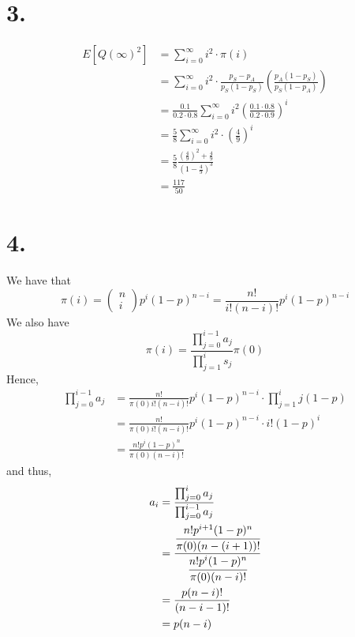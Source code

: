 \documentclass[11pt]{article}
\begin{document}
\section*{3.}
\begin{equation*}
    \begin{aligned}
        E[Q(\infty)^2] &= \sum_{i=0}^\infty i^2 \cdot \pi(i) \\
        &= \sum_{i=0}^\infty i^2 \cdot \frac{p_S - p_A}{p_S(1-p_S)} \left(\frac{p_A(1-p_S)}{p_S(1-p_A)}\right) \\
        &= \frac{0.1}{0.2 \cdot 0.8} \sum_{i=0}^\infty i^2 \left(\frac{0.1 \cdot 0.8}{0.2 \cdot 0.9} \right)^i \\
        &= \frac{5}{8} \sum_{i=0}^\infty i^2 \cdot \left(\frac{4}{9}\right)^i \\
        &= \frac{5}{8} \frac{\left(\frac{4}{9}\right)^2 + \frac{4}{9}}{\left(1-\frac{4}{9}\right)^3} \\
        &= \frac{117}{50} 
    \end{aligned}
\end{equation*}
\pagebreak
\section*{4.}
We have that 
\[
    \pi(i) = 
    \begin{pmatrix}
        n \\
        i    
    \end{pmatrix}
    p^i (1-p)^{n-i}
    = \frac{n!}{i! (n-i)!} p^i (1-p)^{n-i}
\]
We also have 
\[
    \pi(i) = \frac{\prod_{j=0}^{i-1} a_j}{\prod_{j=1}^{i} s_j} \pi(0) 
\]
Hence, 
\begin{equation*}
    \begin{aligned}
        \prod_{j=0}^{i-1} a_j &= \frac{n!}{\pi(0) i! (n-i)!} p^i (1-p)^{n-i} \cdot \prod_{j=1}^{i} j (1-p) \\
        &= \frac{n!}{\pi(0) i! (n-i)!} p^i (1-p)^{n-i} \cdot i! (1-p)^i \\
        &= \frac{n! p^i (1-p)^n}{\pi(0) (n-i)!}
    \end{aligned}
\end{equation*}
and thus,
\begin{equation*}
    \begin{aligned}
        a_i 
        &= \frac{\prod_{j=0}^{i} a_j}{\prod_{j=0}^{i-1} a_j} \\
        &= \cfrac{\cfrac{n! p^{i+1} (1-p)^n}{\pi(0) (n-(i+1))!}}{\cfrac{n! p^i (1-p)^n}{\pi(0) (n-i)!}} \\
        &= \frac{p (n-i)!}{(n-i-1)!} \\
        &= p(n-i)
    \end{aligned}
\end{equation*}
\end{document}

